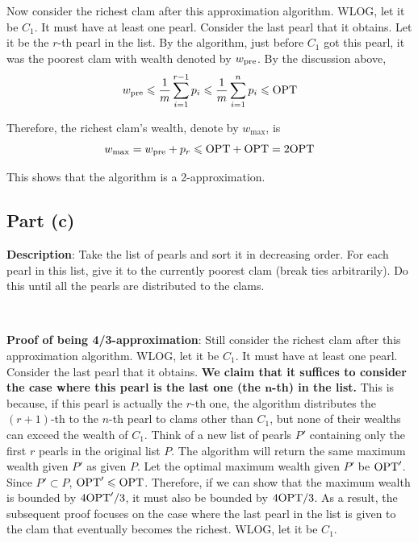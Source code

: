 \documentclass{article}
\begin{document}
Now consider the richest clam after this approximation algorithm. WLOG, let it be $C_1$. It must have at least one pearl. Consider the last pearl that it obtains. Let it be the $r$-th pearl in the list. By the algorithm, just before $C_1$ got this pearl, it was the poorest clam with wealth denoted by $w_{\textup{pre}}$. By the discussion above,
\begin{equation*}
w_{\textup{pre}}\leqslant\frac{1}{m}\sum_{i=1}^{r-1}p_i\leqslant\frac{1}{m}\sum_{i=1}^np_i\leqslant\textup{OPT}
\end{equation*}

Therefore, the richest clam's wealth, denote by $w_{\max}$, is
\begin{equation*}
w_{\max}=w_{\textup{pre}}+p_r\leqslant\textup{OPT}+\textup{OPT}=2\textup{OPT}
\end{equation*}

This shows that the algorithm is a 2-approximation.

\subsection{Part (c)}
\noindent\textbf{Description}: Take the list of pearls and sort it in decreasing order. For each pearl in this list, give it to the currently poorest clam (break ties arbitrarily). Do this until all the pearls are distributed to the clams.

~

\noindent\textbf{Proof of being 4/3-approximation}: Still consider the richest clam after this approximation algorithm. WLOG, let it be $C_1$. It must have at least one pearl. Consider the last pearl that it obtains. \textbf{We claim that it suffices to consider the case where this pearl is the last one (the $\bm{n}$-th) in the list.} This is because, if this pearl is actually the $r$-th one, the algorithm distributes the $(r+1)$-th to the $n$-th pearl to clams other than $C_1$, but none of their wealths can exceed the wealth of $C_1$. Think of a new list of pearls $P'$ containing only the first $r$ pearls in the original list $P$. The algorithm will return the same maximum wealth given $P'$ as given $P$. Let the optimal maximum wealth given $P'$ be $\textup{OPT}'$. Since $P'\subset P$, $\textup{OPT}'\leqslant\textup{OPT}$. Therefore, if we can show that the maximum wealth is bounded by $4\textup{OPT}'/3$, it must also be bounded by $4\textup{OPT}/3$. As a result, the subsequent proof focuses on the case where the last pearl in the list is given to the clam that eventually becomes the richest. WLOG, let it be $C_1$.
\end{document}
